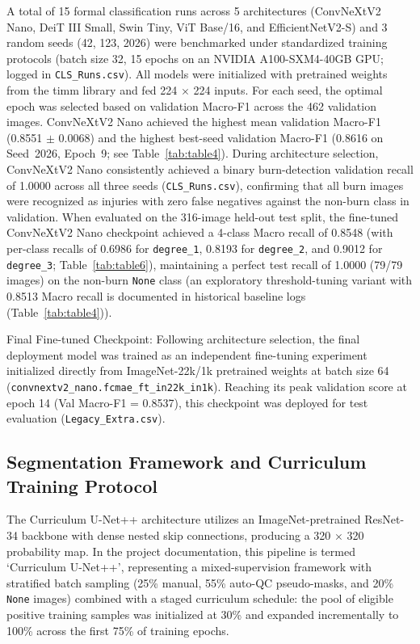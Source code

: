 \documentclass[11pt,a4paper]{article}
\begin{document}
A total of 15 formal classification runs across 5 architectures (ConvNeXtV2 Nano, DeiT III Small, Swin Tiny, ViT Base/16, and EfficientNetV2-S) and 3 random seeds (42, 123, 2026) were benchmarked under standardized training protocols (batch size 32, 15 epochs on an NVIDIA A100-SXM4-40GB GPU; logged in \texttt{CLS\_Runs.csv}). All models were initialized with pretrained weights from the timm library and fed 224 $\times$ 224 inputs. For each seed, the optimal epoch was selected based on validation Macro-F1 across the 462 validation images. ConvNeXtV2 Nano achieved the highest mean validation Macro-F1 (0.8551 $\pm$ 0.0068) and the highest best-seed validation Macro-F1 (0.8616 on Seed~2026, Epoch~9; see Table~\ref{tab:table4}). During architecture selection, ConvNeXtV2 Nano consistently achieved a binary burn-detection validation recall of 1.0000 across all three seeds (\texttt{CLS\_Runs.csv}), confirming that all burn images were recognized as injuries with zero false negatives against the non-burn class in validation. When evaluated on the 316-image held-out test split, the fine-tuned ConvNeXtV2 Nano checkpoint achieved a 4-class Macro recall of 0.8548 (with per-class recalls of 0.6986 for \texttt{degree\_1}, 0.8193 for \texttt{degree\_2}, and 0.9012 for \texttt{degree\_3}; Table~\ref{tab:table6}), maintaining a perfect test recall of 1.0000 (79/79 images) on the non-burn \texttt{None} class (an exploratory threshold-tuning variant with 0.8513 Macro recall is documented in historical baseline logs (Table~\ref{tab:table4})).

Final Fine-tuned Checkpoint: Following architecture selection, the final deployment model was trained as an independent fine-tuning experiment initialized directly from ImageNet-22k/1k pretrained weights at batch size 64 (\texttt{convnextv2\_nano.fcmae\_ft\_in22k\_in1k}). Reaching its peak validation score at epoch 14 (Val Macro-F1 = 0.8537), this checkpoint was deployed for test evaluation (\texttt{Legacy\_Extra.csv}).

\subsection{Segmentation Framework and Curriculum Training Protocol}

The Curriculum U-Net++ architecture utilizes an ImageNet-pretrained ResNet-34 backbone with dense nested skip connections, producing a 320 $\times$ 320 probability map. In the project documentation, this pipeline is termed `Curriculum U-Net++', representing a mixed-supervision framework with stratified batch sampling (25\% manual, 55\% auto-QC pseudo-masks, and 20\% \texttt{None} images) combined with a staged curriculum schedule: the pool of eligible positive training samples was initialized at 30\% and expanded incrementally to 100\% across the first 75\% of training epochs. 
\end{document}
